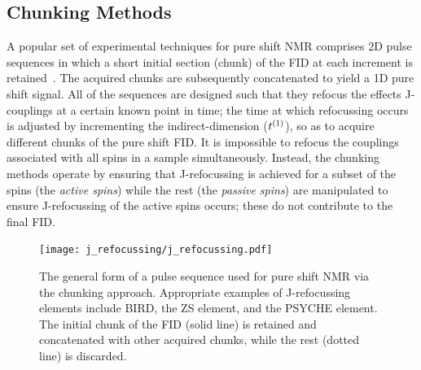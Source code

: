 \subsection{Chunking Methods}
A popular set of experimental techniques for pure shift \ac{NMR} comprises
\ac{2D} pulse sequences in which a short initial section (chunk) of the
\ac{FID} at each increment is retained~\cite{Adams2014}. The acquired chunks are
subsequently concatenated to yield a \ac{1D} pure shift signal.  All of the
sequences are designed such that they refocus the effects J-couplings at a
certain known point in time;
the time at which refocussing occurs is adjusted by incrementing
the indirect-dimension ($t^{(1)}$), so as to acquire
different chunks of the pure shift \ac{FID}. It is impossible to refocus the
couplings associated with all spins in a sample simultaneously. Instead, the
chunking methods operate by ensuring that J-refocussing is achieved for a
subset of the spins (the \emph{active spins}) while the rest (the \emph{passive
spins}) are manipulated to ensure J-refocussing of the active spins occurs;
these do not contribute to the final \ac{FID}.

\begin{figure}
    \centering
    \texttt{[image: j\_refocussing/j\_refocussing.pdf]}
    \caption[
        The general form of a pulse sequence used for pure shift \acs{NMR}
        using the chunking approach.
    ]{
        The general form of a pulse sequence used for pure shift \acs{NMR}
        via the chunking approach. Appropriate examples of J-refocussing
        elements include \acs{BIRD}, the \acl{ZS} element, and the
        \acs{PSYCHE} element. The initial chunk of the \ac{FID} (solid
        line) is retained and concatenated with other acquired chunks,
        while the rest (dotted line) is discarded.
    }
    \label{fig:j-refocussing}
\end{figure}
\makeatletter
{}
\makeatother

